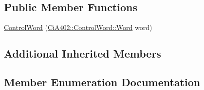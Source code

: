 \subsection*{Public Member Functions}
\begin{DoxyCompactItemize}
\item 
\hyperlink{struct_ci_a402_1_1_control_word_aa4ed7eeae15901f1c98319eba7f8306e}{Control\+Word} (\hyperlink{struct_ci_a402_1_1_control_word_a4c55c383fb4ebea7f52beaea4d232117}{Ci\+A402\+::\+Control\+Word\+::\+Word} word)
\end{DoxyCompactItemize}
\subsection*{Additional Inherited Members}


\subsection{Member Enumeration Documentation}
\hypertarget{struct_ci_a402_1_1_control_word_a4c55c383fb4ebea7f52beaea4d232117}{}
